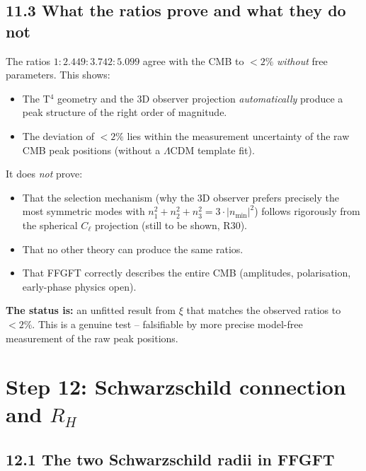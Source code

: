 \subsection*{11.3 What the ratios prove and what they do not}

The ratios $1:2{.}449:3{.}742:5{.}099$ agree with the CMB to
$< 2\%$ \emph{without} free parameters. This shows:

\begin{itemize}
  \item The T$^4$ geometry and the 3D observer projection
        \emph{automatically} produce a peak structure of the right
        order of magnitude.
  \item The deviation of $< 2\%$ lies within the measurement
        uncertainty of the raw CMB peak positions
        (without a $\Lambda$CDM template fit).
\end{itemize}

It does \emph{not} prove:

\begin{itemize}
  \item That the selection mechanism (why the 3D observer prefers
        precisely the most symmetric modes with
        $n_1^2+n_2^2+n_3^2 = 3\cdot|n_\mathrm{min}|^2$) follows
        rigorously from the spherical $C_\ell$ projection
        (still to be shown, R30).
  \item That no other theory can produce the same ratios.
  \item That FFGFT correctly describes the entire CMB
        (amplitudes, polarisation, early-phase physics open).
\end{itemize}

\textbf{The status is:} an unfitted result from $\xi$ that
matches the observed ratios to $< 2\%$.
This is a genuine test -- falsifiable by more precise model-free
measurement of the raw peak positions.

\section{Step 12: Schwarzschild connection and $R_H$}

\subsection*{12.1 The two Schwarzschild radii in FFGFT}

